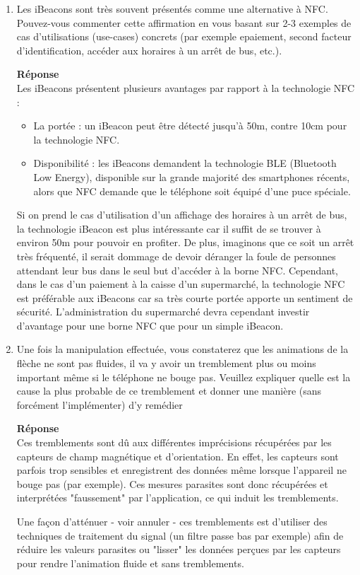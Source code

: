 \documentclass[a4paper]{article}
\begin{document}
\begin{enumerate}
    \item Les iBeacons sont très souvent présentés comme une alternative à NFC. Pouvez-vous commenter cette affirmation en vous basant sur 2-3 exemples de cas d'utilisations (use-cases) concrets (par exemple epaiement, second facteur d'identification, accéder aux horaires à un arrêt de bus, etc.).
    
    \textbf{Réponse} \\
    Les iBeacons présentent plusieurs avantages par rapport à la technologie NFC :
    \begin{itemize}
    		\item La portée : un iBeacon peut être détecté jusqu'à 50m, contre 10cm pour la technologie NFC.
    		\item Disponibilité : les iBeacons demandent la technologie BLE (Bluetooth Low Energy), disponible sur la grande majorité des smartphones récents, alors que NFC demande que le téléphone soit équipé d'une puce spéciale.
    \end{itemize}
    
    	Si on prend le cas d'utilisation d'un affichage des horaires à un arrêt de bus, la technologie iBeacon est plus intéressante car il suffit de se trouver à environ 50m pour pouvoir en profiter. De plus, imaginons que ce soit un arrêt très fréquenté, il serait dommage de devoir déranger la foule de personnes attendant leur bus dans le seul but d'accéder à la borne NFC. Cependant, dans le cas d'un paiement à la caisse d'un supermarché, la technologie NFC est préférable aux iBeacons car sa très courte portée apporte un sentiment de sécurité. L'administration du supermarché devra cependant investir d'avantage pour une borne NFC que pour un simple iBeacon.
    
    \item Une fois la manipulation effectuée, vous constaterez que les animations de la flèche ne sont pas
    fluides, il va y avoir un tremblement plus ou moins important même si le téléphone ne bouge pas.
    Veuillez expliquer quelle est la cause la plus probable de ce tremblement et donner une manière (sans
    forcément l’implémenter) d’y remédier
    
    \textbf{Réponse} \\
    Ces tremblements sont dû aux différentes imprécisions récupérées par les capteurs de champ magnétique et d'orientation. En effet, les capteurs sont parfois trop sensibles et enregistrent des données même lorsque l'appareil ne bouge pas (par exemple). Ces mesures parasites sont donc récupérées et interprétées "faussement" par l'application, ce qui induit les tremblements.
    
    Une façon d'atténuer - voir annuler - ces tremblements est d'utiliser des techniques de traitement du signal (un filtre passe bas par exemple) afin de réduire les valeurs parasites ou "lisser" les données perçues par les capteurs pour rendre l'animation fluide et sans tremblements.
    
\end{enumerate}
\end{document}
